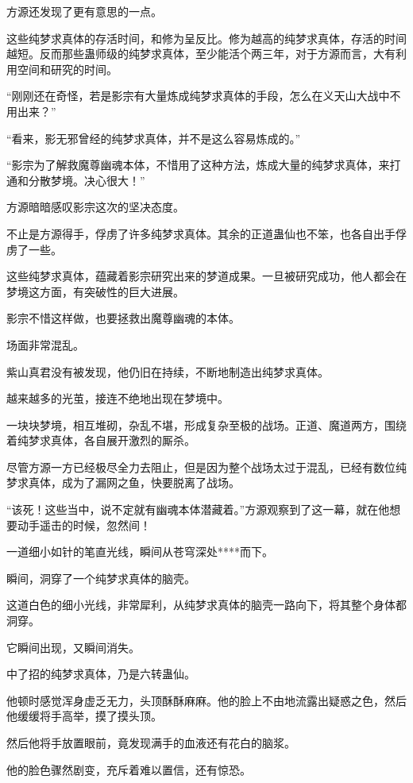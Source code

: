 
\begin{this_body}

方源还发现了更有意思的一点。

这些纯梦求真体的存活时间，和修为呈反比。修为越高的纯梦求真体，存活的时间越短。反而那些蛊师级的纯梦求真体，至少能活个两三年，对于方源而言，大有利用空间和研究的时间。

“刚刚还在奇怪，若是影宗有大量炼成纯梦求真体的手段，怎么在义天山大战中不用出来？”

“看来，影无邪曾经的纯梦求真体，并不是这么容易炼成的。”

“影宗为了解救魔尊幽魂本体，不惜用了这种方法，炼成大量的纯梦求真体，来打通和分散梦境。决心很大！”

方源暗暗感叹影宗这次的坚决态度。

不止是方源得手，俘虏了许多纯梦求真体。其余的正道蛊仙也不笨，也各自出手俘虏了一些。

这些纯梦求真体，蕴藏着影宗研究出来的梦道成果。一旦被研究成功，他人都会在梦境这方面，有突破性的巨大进展。

影宗不惜这样做，也要拯救出魔尊幽魂的本体。

场面非常混乱。

紫山真君没有被发现，他仍旧在持续，不断地制造出纯梦求真体。

越来越多的光茧，接连不绝地出现在梦境中。

一块块梦境，相互堆砌，杂乱不堪，形成复杂至极的战场。正道、魔道两方，围绕着纯梦求真体，各自展开激烈的厮杀。

尽管方源一方已经极尽全力去阻止，但是因为整个战场太过于混乱，已经有数位纯梦求真体，成为了漏网之鱼，快要脱离了战场。

“该死！这些当中，说不定就有幽魂本体潜藏着。”方源观察到了这一幕，就在他想要动手遥击的时候，忽然间！

一道细小如针的笔直光线，瞬间从苍穹深处****而下。

瞬间，洞穿了一个纯梦求真体的脑壳。

这道白色的细小光线，非常犀利，从纯梦求真体的脑壳一路向下，将其整个身体都洞穿。

它瞬间出现，又瞬间消失。

中了招的纯梦求真体，乃是六转蛊仙。

他顿时感觉浑身虚乏无力，头顶酥酥麻麻。他的脸上不由地流露出疑惑之色，然后他缓缓将手高举，摸了摸头顶。

然后他将手放置眼前，竟发现满手的血液还有花白的脑浆。

他的脸色骤然剧变，充斥着难以置信，还有惊恐。


\end{this_body}
